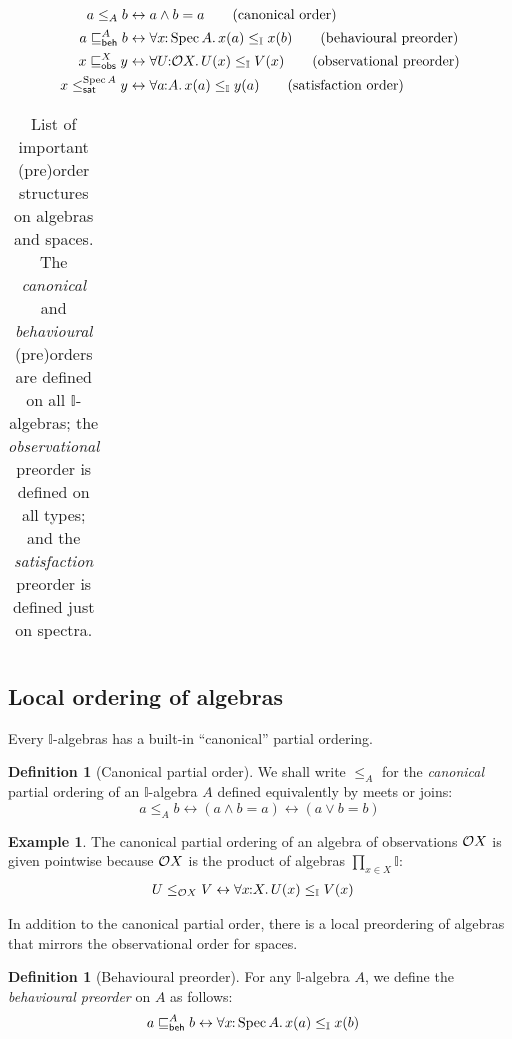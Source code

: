 \documentclass[a4paper,12pt]{amsart}
\theoremstyle{definition}
\newtheorem{example}[theorem]{Example}
\newtheorem{definition}[theorem]{Definition}
\newcommand{\mbb}[1]{\mathbb{#1}}
\newcommand{\I}{\mbb I}
\newcommand{\fa}[2]{\forall #1\!\colon\!\!#2\mathpunct{.}}
\newcommand{\eq}{\leftrightarrow}
\newcommand{\spec}{\operatorname{Spec}}
\begin{document}
\begin{table}[ht]
  \begin{align*}
    a\le_A b &\eq a\wedge b = a
    \tag{canonical order}
    \\
    a\behle[A]b &\eq 
    \fa{x}{\spec{A}}x(a)\le_\I x(b)
    \tag{behavioural preorder}
    \\
    x\obsle[X]y &\eq \fa{U}{\opens{X}} U(x)\le_\I V(x)
    \tag{observational preorder}
    \\ 
    x\satle[\spec{A}]y &\eq \fa{a}{A} x(a)\le_\I y(a)
    \tag{satisfaction order}
  \end{align*}
  \begin{tabular}{ll}
  \end{tabular}
  \caption{List of important (pre)order structures on algebras and spaces. The \emph{canonical} and \emph{behavioural} (pre)orders are defined on all $\I$-algebras; the \emph{observational} preorder is defined on all types; and the \emph{satisfaction} preorder is defined just on spectra.}
  \label{table:orders}
\end{table}


\subsection{Local ordering of algebras}

Every $\I$-algebras has a built-in ``canonical'' partial ordering.

\begin{definition}[Canonical partial order]
  We shall write $\le_A$ for the \emph{canonical} partial ordering of an $\I$-algebra $A$ defined equivalently by meets or joins:
  \[ 
    a\le_A b \eq (a\wedge b = a) \eq (a\vee b = b)
  \]
\end{definition}

\begin{example}
  The canonical partial ordering of an algebra of observations $\mathcal{O}{X}$ is given pointwise because $\mathcal{O}{X}$ is the product of algebras $\prod_{x\in X}\I$:
  \begin{align*}
    U\le_{\opens{X}} V 
    &\eq \fa{x}{X} U(x)\le_\I V(x)
  \end{align*}
\end{example}

In addition to the canonical partial order, there is a local preordering of algebras that mirrors the observational order for spaces.

\begin{definition}[Behavioural preorder]
  For any $\I$-algebra $A$, we define the \emph{behavioural preorder} on $A$ as follows:
  \begin{align*}
    a \behle[A] b &\eq \fa{x}{\spec{A}} x(a) \le_{\I} x(b)
  \end{align*}
\end{definition}
\end{document}
